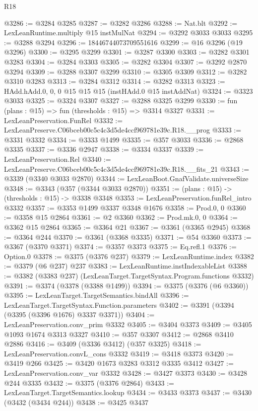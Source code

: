 \begin{lexlean}{R18}
\begin{coremodule}
{{{{{{{{{{{{{{{{{{{@3286 := @3284 @3285
@3287 := @3282 @3286
@3288 := Nat.blt
@3292 := LexLeanRuntime.multiply @15 instMulNat
@3294 := @3292 @3033 @3033
@3295 := @3288 @3294
@3296 := 18446744073709551616
@3299 := @16 @3296 (@19 @3296)
@3300 := @3295 @3299
@3301 := @3287 @3300
@3303 := @3282 @3301 @3283
@3304 := @3284 @3303
@3305 := @3282 @3304
@3307 := @3292 @2870 @3294
@3309 := @3288 @3307 @3299
@3310 := @3305 @3309
@3312 := @3282 @3310 @3283
@3313 := @3284 @3312
@3314 := @3282 @3313
@3323 := HAdd.hAdd.{0, 0, 0} @15 @15 @15 (instHAdd.{0} @15 instAddNat)
@3324 := @3323 @3033
@3325 := @3324 @3307
@3327 := @3288 @3325 @3299
@3330 := fun (plans : @15) => fun (thresholds : @15) => @3314 @3327
@3331 := LexLeanPreservation.FunRel
@3332 := LexLeanPreserve.C06bceb00c5c4c3d5de4ccf969781e39c.R18.__prog
@3333 := @3331 @3332
@3334 := @3333 @1499
@3335 := @357 @3033
@3336 := @2868 @3335
@3337 := @3336 @2947
@3338 := @3334 @3337
@3339 := LexLeanPreservation.Rel
@3340 := LexLeanPreserve.C06bceb00c5c4c3d5de4ccf969781e39c.R18.__fits_21
@3343 := @3339 (@3340 @3033 @2870)
@3344 := LexLeanBoot.GnafValidate.universeSize
@3348 := @3343 (@357 (@3344 @3033 @2870))
@3351 := (plans : @15) -> (thresholds : @15) -> @3338 @3348
@3353 := LexLeanPreservation.funRel_intro @3332
@3357 := @3353 @1499 @3337 @3348 @1676
@3358 := Prod.{0, 0}
@3360 := @3358 @15 @2864
@3361 := @2 @3360
@3362 := Prod.mk.{0, 0}
@3364 := @3362 @15 @2864
@3365 := @3364 @21
@3367 := @3361 (@3365 @2945)
@3368 := @3364 @244
@3370 := @3361 (@3368 @3335)
@3371 := @54 @3360
@3373 := @3367 (@3370 @3371)
@3374 := @3357 @3373
@3375 := Eq.refl.{1}
@3376 := Option.{0}
@3378 := @3375 (@3376 @237)
@3379 := LexLeanRuntime.index
@3382 := @3379 (@6 @237) @237
@3383 := LexLeanRuntime.instIndexableList
@3388 := @3382 (@3383 @237) (LexLeanTarget.TargetSyntax.Program.functions @3332)
@3391 := @3374 (@3378 (@3388 @1499))
@3394 := @3375 (@3376 (@6 @3360))
@3395 := LexLeanTarget.TargetSemantics.bindAll
@3396 := LexLeanTarget.TargetSyntax.Function.parameters
@3402 := @3391 (@3394 (@3395 (@3396 @1676) @3337 @3371))
@3404 := LexLeanPreservation.conv_prim @3332
@3405 := @3404 @3373
@3409 := @3405 @1093 @1674 @3313 @3327
@3410 := @357 @3307
@3412 := @2868 @3410 @2886
@3416 := @3409 (@3336 @3412) (@357 @3325)
@3418 := LexLeanPreservation.convL_cons @3332
@3419 := @3418 @3373
@3420 := @3419 @266
@3425 := @3420 @1673 @3283 @3312 @3335 @3412
@3427 := LexLeanPreservation.conv_var @3332
@3428 := @3427 @3373
@3430 := @3428 @244 @3335
@3432 := @3375 (@3376 @2864)
@3433 := LexLeanTarget.TargetSemantics.lookup
@3434 := @3433 @3373
@3437 := @3430 (@3432 (@3434 @244))
@3438 := @3425 @3437
}}}}}}}}}}}}}}}}}}}
\end{coremodule}
\end{lexlean}
